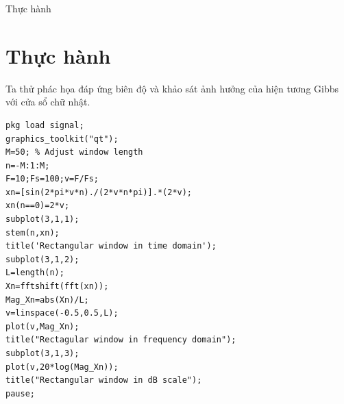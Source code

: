 \documentclass[8pt]{beamer}
\begin{document}
\begin{frame}[fragile]{Thực hành}
	\section{Thực hành}
	Ta thử phác họa đáp ứng biên độ và khảo sát ảnh hưởng của hiện tương Gibbs với cửa sổ chữ nhật.
	\begin{verbatim}
pkg load signal;
graphics_toolkit("qt");
M=50; % Adjust window length
n=-M:1:M;
F=10;Fs=100;v=F/Fs;
xn=[sin(2*pi*v*n)./(2*v*n*pi)].*(2*v);
xn(n==0)=2*v;
subplot(3,1,1);
stem(n,xn);
title('Rectangular window in time domain');
subplot(3,1,2);
L=length(n);
Xn=fftshift(fft(xn));
Mag_Xn=abs(Xn)/L;
v=linspace(-0.5,0.5,L);
plot(v,Mag_Xn);
title("Rectagular window in frequency domain");
subplot(3,1,3);
plot(v,20*log(Mag_Xn));
title("Rectangular window in dB scale");
pause;
\end{verbatim}
\end{frame}
\end{document}

